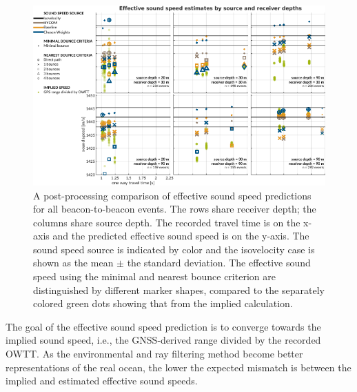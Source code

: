 \documentclass[preprint,TurnOnLineNumbers]{JASA}
\begin{document}
\begin{figure}[!ht]
\includegraphics[width=\columnwidth]{Fig9.pdf}
\caption{A post-processing comparison of effective sound speed predictions for all beacon-to-beacon events. The rows share receiver depth; the columns share source depth. The recorded travel time is on the x-axis and the predicted effective sound speed is on the y-axis. The sound speed source is indicated by color and the isovelocity case is shown as the mean $\pm$ the standard deviation. The effective sound speed using the minimal and nearest bounce criterion are distinguished by different marker shapes, compared to the separately colored green dots showing that from the implied calculation.}
\label{fig:gvel-post}
\end{figure}

The goal of the effective sound speed prediction is to converge towards the implied sound speed, i.e., the GNSS-derived range divided by the recorded OWTT.
As the environmental and ray filtering method become better representations of the real ocean, the lower the expected mismatch is between the implied and estimated effective sound speeds.
\end{document}
